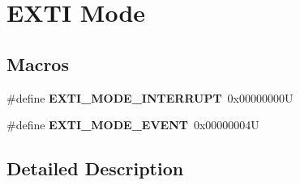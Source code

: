 \hypertarget{group___e_x_t_i___mode}{}\section{E\+X\+TI Mode}
\label{group___e_x_t_i___mode}
\subsection*{Macros}
\begin{DoxyCompactItemize}
\item 
\mbox{\label{group___e_x_t_i___mode_gae1e032ec592296be21f416a79a44f4f5}} 
\#define {\bfseries E\+X\+T\+I\+\_\+\+M\+O\+D\+E\+\_\+\+I\+N\+T\+E\+R\+R\+U\+PT}~0x00000000U
\item 
\mbox{\label{group___e_x_t_i___mode_ga672fef88f86b5d8a421194e3dac0f2e1}} 
\#define {\bfseries E\+X\+T\+I\+\_\+\+M\+O\+D\+E\+\_\+\+E\+V\+E\+NT}~0x00000004U
\end{DoxyCompactItemize}


\subsection{Detailed Description}
